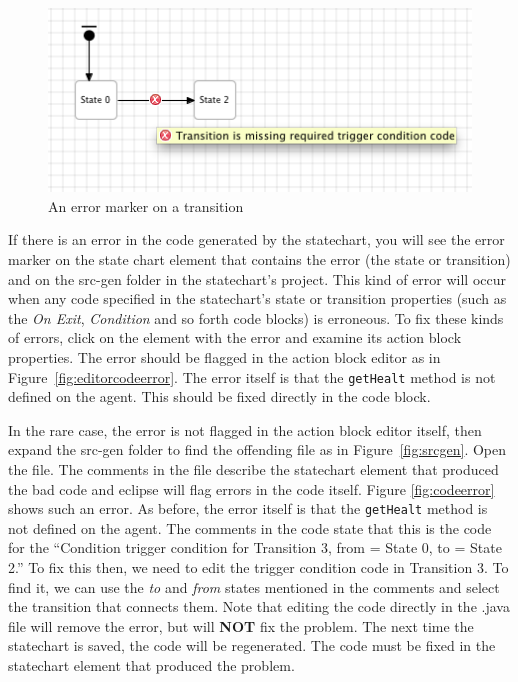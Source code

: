 \documentclass[11pt]{amsart}
\begin{document}
\begin{figure}
\begin{center}
\vspace{.2in}
\centerline {
\includegraphics[width=5in]{StatechartsImages/transition_error.png}
}
\caption{An error marker on a transition}
\label{fig:transitionerror}
\end{center}
\end{figure}


If there is an error in the code generated by the statechart, you will see the error marker on the state chart element that contains the error (the state or transition) and on the src-gen folder in the statechart's project. This kind of error will occur when any code specified in the statechart's state or transition properties (such as the \emph{On Exit}, \emph{Condition} and so forth code blocks) is erroneous. To fix these kinds of errors, click on the element with the error and examine its action block properties. The error should be flagged in the action block editor as in Figure~\ref{fig:editorcodeerror}.  The error itself is that the \texttt{getHealt} method is not defined on the agent. This should be fixed directly in the code block. 

In the rare case, the error is not flagged in the action block editor itself, then expand the src-gen folder to find the offending file as in Figure~\ref{fig:srcgen}. Open the file. The comments in the file describe the statechart element that produced the bad code and eclipse will flag errors in the code itself. Figure \ref{fig:codeerror} shows such an error. As before, the error itself is that the \texttt{getHealt} method is not defined on the agent. The comments in the code state that this is the code for the ``Condition trigger condition for Transition 3, from = State 0, to = State 2.'' To fix this then, we need to edit the trigger condition code in Transition 3.  To find it, we  can use the \emph{to} and \emph{from} states mentioned in the comments and select the transition that connects them.  Note that editing the code directly in the .java file will remove the error, but will \textbf{NOT} fix the problem. The next time the statechart is saved, the code will be regenerated. The code must be fixed in the statechart element that produced the problem.
\end{document}
